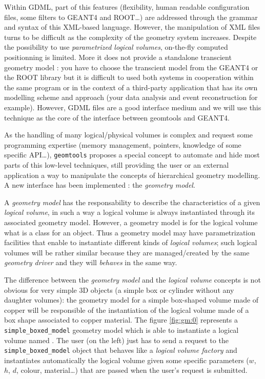Within  GDML,  part  of  this features  (flexibility,  human  readable
configuration  files,  some  filters  to  GEANT4  and  ROOT\dots)  are
addressed   through  the   grammar  and   syntax  of   this  XML-based
language. However, the manipulation of XML files turns to be difficult
as  the  complexity of  the  geometry  system  increases. Despite  the
possibility  to use  \emph{parametrized  logical volumes},  on-the-fly
computed  positionning  is  limited.   More  it  does  not  provide  a
standalone  transcient  geometry  model  :  you  have  to  choose  the
transcient model from the GEANT4  or the ROOT library but it is difficult
to used both systems in  cooperation  within  the same  program
or  in  the context  of  a
third-party application that has its own modelling scheme and approach
(your data  analysis and event reconstruction  for example).  However,
GDML files are a  good interface medium and we will use this technique
 as the core of the interface between geomtools and GEANT4.

As  the  handling of  many  logical/physical  volumes  is complex  and
request some programming expertise (memory management, pointers, knowledge
of some specific API\dots),
\texttt{geomtools} proposes a special concept to automate and hide
most parts of  this low-level techniques, still providing  the user or
an external application a way  to manipulate the concepts of hierarchical
geometry  modelling.  A  new  interface  has been  implemented  :  the
\emph{geometry model}.

A  \emph{geometry  model}  has  the  responsability  to  describe  the
characteristics  of a  given \emph{logical  volume}, in  such a  way a
logical volume is always  instantiated through its associated geometry
model. However, a  geometry model is for the logical  volume what is a
class for  an object.  Thus  a geometry model may  have parametrization
facilities that enable to  instantiate different kinds of \emph{logical
  volumes}; such logical volumes will be rather similar because
they are managed/created by the same \emph{geometry driver} and
they will \emph{behaves} in the same way.

The difference between the \emph{geometry model} and the \emph{logical
  volume} concepts is not obvious for very simple 3D objects (a simple
box or cylinder without any  daughter volumes): the geometry model for
a simple box-shaped  volume made of copper will  be responsible of the
instantiation of the logical volume  made of a box shape associated to
copper     material.     The      figure     \ref{fig:gm:0}     represents     a
\texttt{simple\_boxed\_model}   geometry  model   which   is  able   to
instantiate a logical volume  named .  The user (on
the    left)    just    has    to    send    a    request    to    the
\texttt{simple\_boxed\_model} object that behaves like a \emph{logical
  volume     factory}    and     instantiates     automatically    the
  logical  volume  given some  specific  parameters
($w$, $h$, $d$, colour, material\dots) that are passed when the user's
request is submitted.

